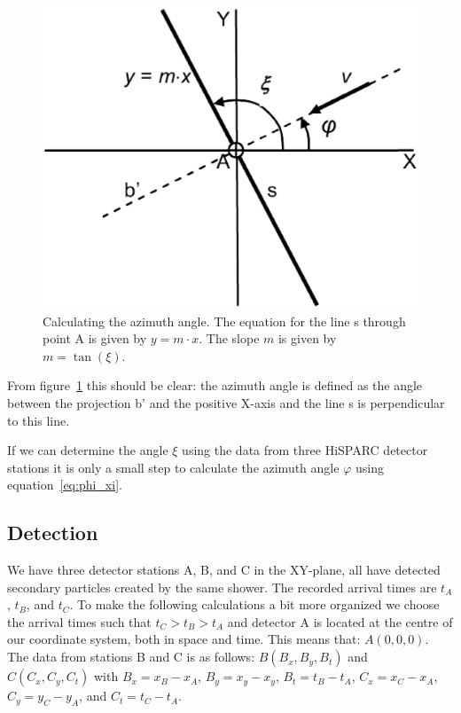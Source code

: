 \documentclass[12pt,a4paper]{article}
\numberwithin{equation}{section}
\numberwithin{figure}{section}
\numberwithin{table}{section}
\begin{document}
\begin{figure}\begin{center}
\includegraphics[scale=0.4]{slope.eps}
\caption{Calculating the azimuth angle. The equation for the line s through point A is given by $y = m \cdot x$. The slope $m$ is given by $m = \tan(\xi)$.}\label{fig:slope}
\end{center}\end{figure}

From figure~\ref{fig:slope} this should be clear: the azimuth angle is defined as the angle between the projection b' and the positive X-axis and the line s is perpendicular to this line.

If we can determine the angle $\xi$ using the data from three HiSPARC detector stations it is only a small step to calculate the azimuth angle $\varphi$ using equation~\ref{eq:phi_xi}.

\subsection{Detection}
We have three detector stations A, B, and C in the XY-plane, all have detected secondary particles created by the same shower. The recorded arrival times are $t_A$, $t_B$, and $t_C$. To make the following calculations a bit more organized we choose the arrival times such that $t_C > t_B > t_A$ and detector A is located at the centre of our coordinate system, both in space and time. This means that: $A(0,0,0)$. The data from stations B and C is as follows: $B(B_x,B_y,B_t)$ and $C(C_x,C_y,C_t)$ with $B_x=x_B-x_A$, $B_y=x_y-x_y$, $B_t=t_B-t_A$, $C_x=x_C-x_A$, $C_y=y_C-y_A$, and $C_t=t_C-t_A$.
\end{document}
